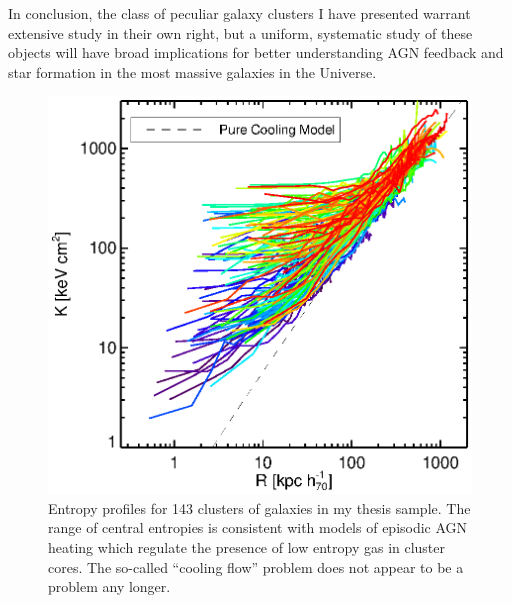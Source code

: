 \documentclass[11pt]{article}
\begin{document}
In conclusion, the class of peculiar galaxy clusters I have presented
warrant extensive study in their own right, but a uniform, systematic
study of these objects will have broad implications for better
understanding AGN feedback and star formation in the most massive
galaxies in the Universe.

\clearpage
\begin{figure}[t]
    \begin{minipage}[t]{0.5\linewidth}
        \centering
        \includegraphics*[width=\textwidth, trim=26mm 8mm 30mm 10mm, clip]{splots}
        \caption{\small Entropy profiles for 143 clusters of galaxies
        in my thesis sample. The range of central entropies is
        consistent with models of episodic AGN heating which regulate
        the presence of low entropy gas in cluster cores. The
        so-called ``cooling flow'' problem does not appear to be a problem any
        longer.}
        \label{fig:splots}
    \end{minipage}
    \hspace{0.1in}
    \begin{minipage}[t]{0.5\linewidth}
        \centering

\end{minipage}
\end{figure}
\end{document}
